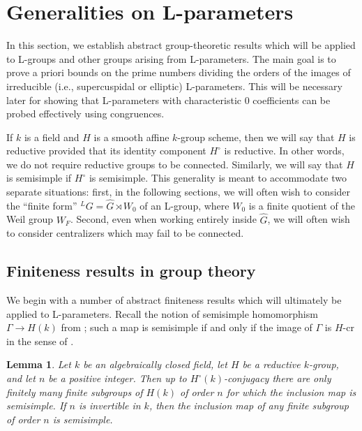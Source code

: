 \documentclass[reqno]{amsart}
\numberwithin{equation}{subsection}
\newcommand{\ld}{{}^L}
\newtheorem{lemma}[thm]{Lemma}
\theoremstyle{remark}
\numberwithin{equation}{subsection}
\numberwithin{figure}{subsection}
\begin{document}
\section{Generalities on L-parameters}\label{sec:generalities-on-l-parameters}

In this section, we establish abstract group-theoretic results which will be applied to L-groups and other groups arising from L-parameters. The main goal is to prove a priori bounds on the prime numbers dividing the orders of the images of irreducible (i.e., supercuspidal or elliptic) L-parameters. This will be necessary later for showing that L-parameters with characteristic $0$ coefficients can be probed effectively using congruences.

If $k$ is a field and $H$ is a smooth affine $k$-group scheme, then we will say that $H$ is reductive provided that its identity component $H^\circ$ is reductive. In other words, we do not require reductive groups to be connected. Similarly, we will say that $H$ is semisimple if $H^\circ$ is semisimple. This generality is meant to accommodate two separate situations: first, in the following sections, we will often wish to consider the ``finite form'' $\ld G = \widehat{G} \rtimes W_0$ of an L-group, where $W_0$ is a finite quotient of the Weil group $W_F$. Second, even when working entirely inside $\widehat{G}$, we will often wish to consider centralizers which may fail to be connected. 

\subsection{Finiteness results in group theory}\label{ssec:group-theory}
 

We begin with a number of abstract finiteness results which will ultimately be applied to L-parameters. Recall the notion of semisimple homomorphism $\Gamma \to H(k)$ from \cite[\S 10.1]{CF26a}; such a map is semisimple if and only if the image of $\Gamma$ is $H$-cr in the sense of \cite{BMR05}.

\begin{lemma}\label{lemma:finite-subgroups-invertible-order}
Let $k$ be an algebraically closed field, let $H$ be a reductive $k$-group, and let $n$ be a positive integer. Then up to $H^\circ(k)$-conjugacy there are only finitely many finite subgroups of $H(k)$ of order $n$ for which the inclusion map is semisimple. If $n$ is invertible in $k$, then the inclusion map of any finite subgroup of order $n$ is semisimple.
\end{lemma}
\end{document}
